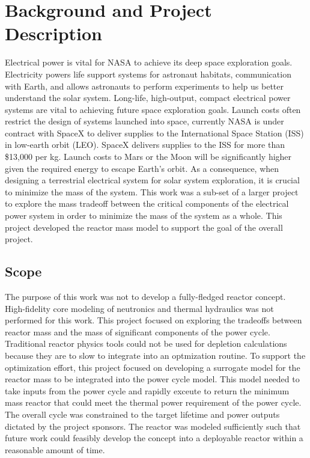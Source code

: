 \chapter{Background and Project Description}
Electrical power is vital for NASA to achieve its deep space exploration goals.
Electricity powers life support systems for astronaut habitats, communication
with Earth, and allows astronauts to perform experiments to help us better
understand the solar system. Long-life, high-output, compact electrical power
systems are vital to achieving future space exploration goals. Launch costs 
often restrict the design of systems launched
into space, currently NASA is under contract with SpaceX to deliver supplies to
the International Space Station (ISS) in low-earth orbit (LEO). SpaceX delivers
supplies to the ISS for more than \$13,000 per kg\citep{spacex}. Launch costs to Mars or the
Moon will be significantly higher given the required energy to escape Earth's
orbit. As a consequence, when designing a terrestrial electrical system for
solar system exploration, it is crucial to minimize the mass of the system. This
work was a sub-set of a larger
project to explore the mass tradeoff between the critical components of the
electrical power system in order to minimize the mass of the system as a whole.
This project developed the reactor mass model to support the goal of the overall
project.

\section{Scope}
The purpose of this work was not to develop a fully-fledged reactor concept.
High-fidelity core modeling of neutronics and thermal hydraulics was not
performed for this work.
This project focused on exploring the tradeoffs between reactor mass and the
mass of significant components of the power cycle. Traditional reactor physics
tools could not be used for depletion calculations because they are to slow to
integrate into an optmization routine. To support the optimization effort, this project focused on
developing a surrogate model for the reactor mass to be integrated into the
power cycle model. This model needed to take inputs from the power cycle and
rapidly exceute to return the minimum mass reactor that could meet the thermal
power requirement of the power cycle. The overall cycle was constrained to the
target lifetime and power outputs dictated by the project sponsors. The reactor
was modeled sufficiently such that future work could feasibly develop the
concept into a deployable reactor within a reasonable amount of time.

